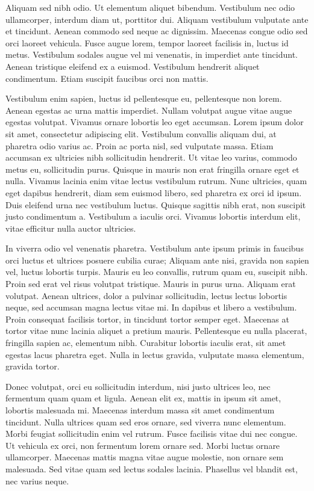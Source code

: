 \documentclass{homework}
\begin{document}
Aliquam sed nibh odio. Ut elementum aliquet bibendum. Vestibulum nec odio ullamcorper, interdum diam ut, porttitor dui. Aliquam vestibulum vulputate ante et tincidunt. Aenean commodo sed neque ac dignissim. Maecenas congue odio sed orci laoreet vehicula. Fusce augue lorem, tempor laoreet facilisis in, luctus id metus. Vestibulum sodales augue vel mi venenatis, in imperdiet ante tincidunt. Aenean tristique eleifend ex a euismod. Vestibulum hendrerit aliquet condimentum. Etiam suscipit faucibus orci non mattis.

Vestibulum enim sapien, luctus id pellentesque eu, pellentesque non lorem. Aenean egestas ac urna mattis imperdiet. Nullam volutpat augue vitae augue egestas volutpat. Vivamus ornare lobortis leo eget accumsan. Lorem ipsum dolor sit amet, consectetur adipiscing elit. Vestibulum convallis aliquam dui, at pharetra odio varius ac. Proin ac porta nisl, sed vulputate massa. Etiam accumsan ex ultricies nibh sollicitudin hendrerit. Ut vitae leo varius, commodo metus eu, sollicitudin purus. Quisque in mauris non erat fringilla ornare eget et nulla. Vivamus lacinia enim vitae lectus vestibulum rutrum. Nunc ultricies, quam eget dapibus hendrerit, diam sem euismod libero, sed pharetra ex orci id ipsum. Duis eleifend urna nec vestibulum luctus. Quisque sagittis nibh erat, non suscipit justo condimentum a. Vestibulum a iaculis orci. Vivamus lobortis interdum elit, vitae efficitur nulla auctor ultricies.

In viverra odio vel venenatis pharetra. Vestibulum ante ipsum primis in faucibus orci luctus et ultrices posuere cubilia curae; Aliquam ante nisi, gravida non sapien vel, luctus lobortis turpis. Mauris eu leo convallis, rutrum quam eu, suscipit nibh. Proin sed erat vel risus volutpat tristique. Mauris in purus urna. Aliquam erat volutpat. Aenean ultrices, dolor a pulvinar sollicitudin, lectus lectus lobortis neque, sed accumsan magna lectus vitae mi. In dapibus et libero a vestibulum. Proin consequat facilisis tortor, in tincidunt tortor semper eget. Maecenas at tortor vitae nunc lacinia aliquet a pretium mauris. Pellentesque eu nulla placerat, fringilla sapien ac, elementum nibh. Curabitur lobortis iaculis erat, sit amet egestas lacus pharetra eget. Nulla in lectus gravida, vulputate massa elementum, gravida tortor.

Donec volutpat, orci eu sollicitudin interdum, nisi justo ultrices leo, nec fermentum quam quam et ligula. Aenean elit ex, mattis in ipsum sit amet, lobortis malesuada mi. Maecenas interdum massa sit amet condimentum tincidunt. Nulla ultrices quam sed eros ornare, sed viverra nunc elementum. Morbi feugiat sollicitudin enim vel rutrum. Fusce facilisis vitae dui nec congue. Ut vehicula ex orci, non fermentum lorem ornare sed. Morbi luctus ornare ullamcorper. Maecenas mattis magna vitae augue molestie, non ornare sem malesuada. Sed vitae quam sed lectus sodales lacinia. Phasellus vel blandit est, nec varius neque.
\end{document}
